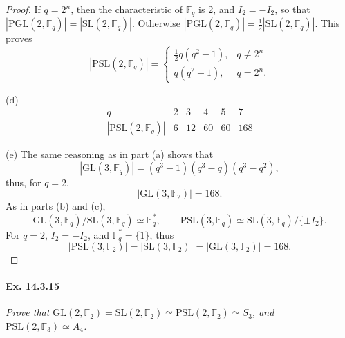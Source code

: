 \documentclass[11pt,a4paper]{article}
\newcommand{\F}{\mathbb{F}}
\begin{document}
\begin{proof}
  If $q=2^n$, then the characteristic of $\F_q$ is 2, and $I_2 = - I_2$, so that $|\mathrm{PGL}(2,\F_q) | = | \mathrm{SL}(2,\F_q)|$. Otherwise $|\mathrm{PGL}(2,\F_q) | = \frac{1}{2}| \mathrm{SL}(2,\F_q)|$. This proves
   $$|\mathrm{PSL}(2,\F_q)| = 
  \left\{
  \begin{array}{ll}
  \frac{1}{2} q (q^2-1),&q\ne 2^n\\
  q(q^2-1), & q=2^n.
  \end{array}
  \right.
  $$
  \item[(d)]
  $$
  \begin{array}{c|ccccc}
   q & 2 & 3 & 4 & 5 & 7\\
   \hline
  |\mathrm{PSL}(2,\F_q)| & 6 & 12 & 60 & 60 & 168
  \end{array}
   $$
   \item[(e)]  The same reasoning as in part (a) shows that
   $$|\mathrm{GL}(3,\F_q)| = (q^3 - 1)(q^3 -q)(q^3 -q^2),$$
   thus, for $q=2$,
      $$|\mathrm{GL}(3,\F_2)| = 168.$$
     As in parts (b) and (c),
      $$\mathrm{GL}(3,\F_q)/ \mathrm{SL}(3,\F_q) \simeq \F_q^*,\qquad  \mathrm{PSL}(3,\F_q) \simeq \mathrm{SL}(3,\F_q)/\{\pm I_2\}.$$
    For $q=2$, $I_2 = -I_2$, and  $\F_q^* = \{1\}$, thus
    $$|\mathrm{PSL}(3,\F_2)| = |\mathrm{SL}(3,\F_2)|  = |\mathrm{GL}(3,\F_2)| = 168.$$
      
  \end{proof}

 
  \paragraph{Ex. 14.3.15}{\it Prove that $\mathrm{GL}(2,\F_2) = \mathrm{SL}(2,\F_2) \simeq \mathrm{PSL}(2,\F_2) \simeq S_3$, and ${\mathrm{PSL}(2,\F_3) \simeq A_4}$.
 }
 
\end{document}
